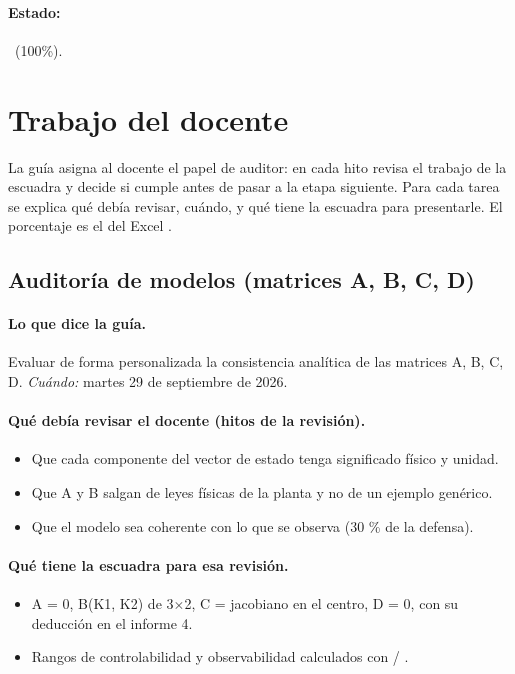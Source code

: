 \documentclass[a4paper,11pt]{article}
\begin{document}
\paragraph{Estado:} \cumple~(100\%).
\section{Trabajo del docente}
La guía asigna al docente el papel de auditor: en cada hito revisa el trabajo de la escuadra y decide si cumple antes de pasar a la etapa siguiente. Para cada tarea se explica qué debía revisar, cuándo, y qué tiene la escuadra para presentarle. El porcentaje es el del Excel .
\subsection{Auditoría de modelos (matrices A, B, C, D)}
\paragraph{Lo que dice la guía.} Evaluar de forma personalizada la consistencia analítica de las matrices A, B, C, D. \textit{Cuándo:} martes 29 de septiembre de 2026.
\paragraph{Qué debía revisar el docente (hitos de la revisión).}
\begin{itemize}
\item[$\square$] Que cada componente del vector de estado tenga significado físico y unidad.
\item[$\square$] Que A y B salgan de leyes físicas de la planta y no de un ejemplo genérico.
\item[$\square$] Que el modelo sea coherente con lo que se observa (30 \% de la defensa).
\end{itemize}
\paragraph{Qué tiene la escuadra para esa revisión.}
\begin{itemize}
\item A = 0, B(K1, K2) de 3$\times$2, C = jacobiano en el centro, D = 0, con su deducción en el informe 4.
\item Rangos de controlabilidad y observabilidad calculados con  / .
\end{itemize}
\end{document}
